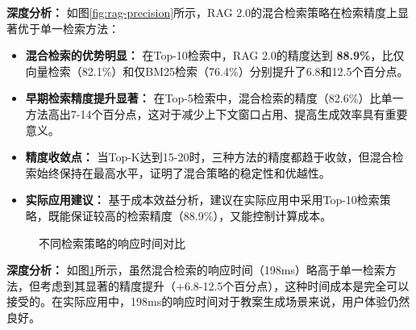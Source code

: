 \documentclass[12pt,a4paper,fontset=fandol]{ctexart}
\begin{document}
\textbf{深度分析：} 如图\ref{fig:rag-precision}所示，RAG 2.0的混合检索策略在检索精度上显著优于单一检索方法：
\begin{itemize}
    \item \textbf{混合检索的优势明显：} 在Top-10检索中，RAG 2.0的精度达到 \textbf{88.9\%}，比仅向量检索（82.1\%）和仅BM25检索（76.4\%）分别提升了6.8和12.5个百分点。
    \item \textbf{早期检索精度提升显著：} 在Top-5检索中，混合检索的精度（82.6\%）比单一方法高出7-14个百分点，这对于减少上下文窗口占用、提高生成效率具有重要意义。
    \item \textbf{精度收敛点：} 当Top-K达到15-20时，三种方法的精度都趋于收敛，但混合检索始终保持在最高水平，证明了混合策略的稳定性和优越性。
    \item \textbf{实际应用建议：} 基于成本效益分析，建议在实际应用中采用Top-10检索策略，既能保证较高的检索精度（88.9\%），又能控制计算成本。
\end{itemize}

\begin{figure}[H]
    \centering
    \caption{不同检索策略的响应时间对比}
    \label{fig:rag-latency}
\end{figure}

\textbf{深度分析：} 如图\ref{fig:rag-latency}所示，虽然混合检索的响应时间（198ms）略高于单一检索方法，但考虑到其显著的精度提升（+6.8-12.5个百分点），这种时间成本是完全可以接受的。在实际应用中，198ms的响应时间对于教案生成场景来说，用户体验仍然良好。
\end{document}
